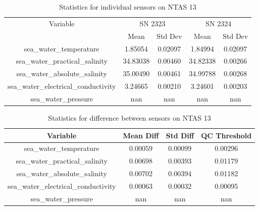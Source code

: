 \begin{table}[h]
\centering
\begin{tabular}{|c|c|c|c|c|}
\hline
Variable & \multicolumn{2}{c|}{SN 2323} & \multicolumn{2}{c|}{SN 2324} \\
& Mean & Std Dev & Mean & Std Dev \\
\hline
sea\_water\_temperature & 1.85054 & 0.02097 & 1.84994 & 0.02097 \\
sea\_water\_practical\_salinity & 34.83038 & 0.00460 & 34.82338 & 0.00266 \\
sea\_water\_absolute\_salinity & 35.00490 & 0.00461 & 34.99788 & 0.00268 \\
sea\_water\_electrical\_conductivity & 3.24665 & 0.00210 & 3.24601 & 0.00203 \\
sea\_water\_pressure & nan & nan & nan & nan \\
\hline
\end{tabular}
\caption{Statistics for individual sensors on NTAS 13}
\end{table}

\begin{table}[h]
\centering
\begin{tabular}{|c|c|c|c|}
\hline
Variable & Mean Diff & Std Diff & QC Threshold \\
\hline
sea\_water\_temperature & 0.00059 & 0.00099 & 0.00296 \\
sea\_water\_practical\_salinity & 0.00698 & 0.00393 & 0.01179 \\
sea\_water\_absolute\_salinity & 0.00702 & 0.00394 & 0.01182 \\
sea\_water\_electrical\_conductivity & 0.00063 & 0.00032 & 0.00095 \\
sea\_water\_pressure & nan & nan & nan \\
\hline
\end{tabular}
\caption{Statistics for difference between sensors on NTAS 13}
\end{table}
